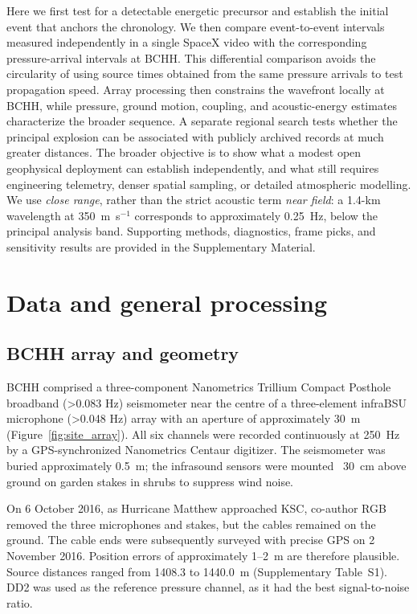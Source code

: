 \documentclass[]{seismica}
\begin{document}
Here we first test for a detectable energetic precursor and establish the
initial event that anchors the chronology. We then compare event-to-event
intervals measured independently in a single SpaceX video with the corresponding
pressure-arrival intervals at BCHH. This differential comparison avoids the
circularity of using source times obtained from the same pressure arrivals to
test propagation speed. Array processing then constrains the wavefront locally
at BCHH, while pressure, ground motion, coupling, and acoustic-energy estimates
characterize the broader sequence. A separate regional search tests whether the
principal explosion can be associated with publicly archived records at much
greater distances. The broader objective is to show what a modest open
geophysical deployment can establish independently, and what still requires
engineering telemetry, denser spatial sampling, or detailed atmospheric
modelling. We use \emph{close range}, rather than the strict acoustic term
\emph{near field}: a 1.4-km wavelength at 350~m~s$^{-1}$ corresponds to
approximately 0.25~Hz, below the principal analysis band. Supporting methods,
diagnostics, frame picks, and sensitivity results are provided in the
Supplementary Material.


\section{Data and general processing}
\label{sec:data}

\subsection{BCHH array and geometry}

BCHH comprised a three-component Nanometrics Trillium Compact Posthole
broadband (>0.083 Hz) seismometer near the centre of a three-element infraBSU microphone (>0.048 Hz) array with an
aperture of approximately 30~m (Figure~\ref{fig:site_array}). All six channels
were recorded continuously at 250~Hz by a GPS-synchronized Nanometrics
Centaur digitizer. The seismometer was buried approximately 0.5~m; the infrasound sensors
were mounted ~30~cm above ground on garden stakes in shrubs to suppress wind noise.

On 6 October 2016, as Hurricane Matthew approached KSC, co-author RGB 
removed the three microphones and stakes, but the cables remained on 
the ground. The cable ends were subsequently surveyed with precise GPS on
2 November 2016. Position errors of approximately 1--2~m are therefore plausible.
Source distances ranged from 1408.3 to 1440.0~m
(Supplementary Table~S1). DD2 was used as the reference
pressure channel, as it had the best signal-to-noise ratio.
\end{document}
